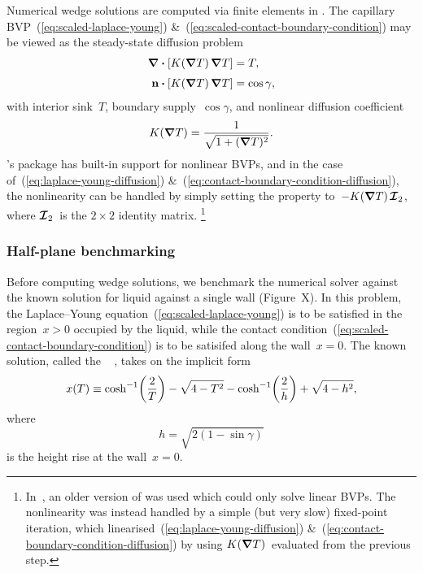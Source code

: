 Numerical wedge solutions are computed
via finite elements in .
The capillary BVP~(\ref{eq:scaled-laplace-young})
\&~(\ref{eq:scaled-contact-boundary-condition})
may be viewed as the steady-state diffusion problem
\begin{align}
  \del \dotp \squarebr[\bulkysize]{K (\del T) \del T} &= T,
    \label{eq:laplace-young-diffusion}
    \\[\tallspace]
  \normalvec \dotp \squarebr[\bulkysize]{K (\del T) \del T} &= \cos\gamma,
  \label{eq:contact-boundary-condition-diffusion}
\end{align}
with interior sink~$T$, boundary supply~$\cos\gamma$,
and nonlinear diffusion coefficient
\begin{equation}
  K (\mathop{}\!\boldsymbol{\mathbf{\nabla}} T) = \frac{1}{\sqrt{1 + (\mathop{}\!\boldsymbol{\mathbf{\nabla}} T)^2}}.
  \label{eq:laplace-young-diffusion-coefficient}
\end{equation}
's  package
has built-in support for nonlinear BVPs,
and in the case of~(\ref{eq:laplace-young-diffusion})
\&~(\ref{eq:contact-boundary-condition-diffusion}),
the nonlinearity can be handled
by simply setting the  property
to~$-K (\del T) \idenmat[2]$,
where $\idenmat[2]$~is the $2 \times 2$ identity matrix.%
\footnote{
  In~\cite{li-2017-thesis-rounding-capillary-wedge},
  an older version of  was used
  which could only solve linear BVPs.
  The nonlinearity was instead handled
  by a simple (but very slow) fixed-point iteration,
  which linearised~(\ref{eq:laplace-young-diffusion})
  \&~(\ref{eq:contact-boundary-condition-diffusion})
  by using $K (\mathop{}\!\boldsymbol{\mathbf{\nabla}} T)$~evaluated from the previous step.
}

\subsubsection{Half-plane benchmarking}
\label{sec:moderate.nonlinear.numerical.half-plane}

Before computing wedge solutions,
we benchmark the numerical solver
against the known solution
for liquid against a single wall
(Figure~X). %
In this problem,
the Laplace--Young equation~(\ref{eq:scaled-laplace-young})
is to be satisfied in the region~$x > 0$ occupied by the liquid,
while the contact condition~(\ref{eq:scaled-contact-boundary-condition})
is to be satisifed along the wall~$x = 0$.
The known solution,
called the ~%
  \cite{anderson-2006-exact-solutions-laplace-young},
takes on the implicit form
\begin{equation}
  x (T) \ideq
    \cosh^{-1} \roundbr*{\frac{2}{T}} - \sqrt{4 - T^2}
    - \cosh^{-1} \roundbr*{\frac{2}{h}} + \sqrt{4 - h^2},
  \label{eq:half-plane-solution}
\end{equation}
where
\begin{equation}
  h = \sqrt{2 (1 - \sin\gamma)}
  \label{eq:half-plane-height}
\end{equation}
is the height rise at the wall~$x = 0$.

